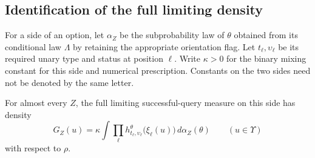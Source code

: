 \subsection{Identification of the full limiting density}

For a side of an option, let $\alpha_Z$ be the subprobability law of
$\theta$ obtained from its conditional law $\Lambda$ by retaining the
appropriate orientation flag. Let $t_\ell,\upsilon_\ell$ be its required unary
type and status at position $\ell$. Write $\kappa>0$ for the binary
mixing constant for this side and numerical prescription. Constants on
the two sides need not be denoted by the same letter.

\begin{lemma}
\label{lem:limit-density}
For almost every $Z$, the full limiting successful-query measure on
this side has density
\begin{equation}
\label{eq:limit-density}
G_Z(u)=\kappa\int
  \prod_{\ell}h^\theta_{t_\ell,\upsilon_\ell}
                    \bigl(\xi_\ell(u)\bigr)\,d\alpha_Z(\theta)
\qquad (u\in\Upsilon)
\end{equation}
with respect to $\rho$.
\end{lemma}

